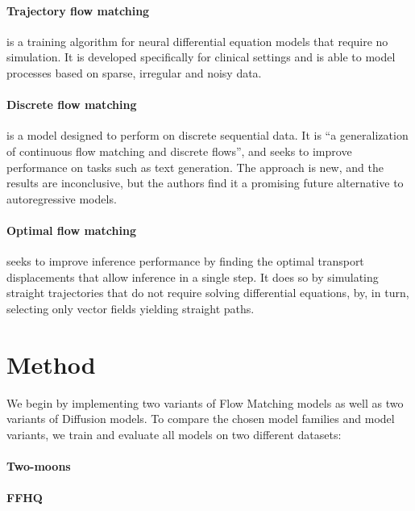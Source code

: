\documentclass{article}
\begin{document}
\paragraph{Trajectory flow matching} is a training algorithm for neural differential equation models that require no simulation. It is developed specifically for clinical settings and is able to model processes based on sparse, irregular and noisy data. \cite{zhang2024trajctory}

\paragraph{Discrete flow matching} is a model designed to perform on discrete sequential data. It is ``a generalization of continuous flow matching and discrete flows'', and seeks to improve performance on tasks such as text generation. The approach is new, and the results are inconclusive, but the authors find it a promising future alternative to autoregressive models. \cite{gat2024discrete} 

\paragraph{Optimal flow matching} seeks to improve inference performance by finding the optimal transport displacements that allow inference in a single step. It does so by simulating straight trajectories that do not require solving differential equations, by, in turn, selecting only vector fields yielding straight paths. \cite{kornilov2024optimal}

\section{Method}

We begin by implementing two variants of Flow Matching models as well as two variants of Diffusion models. To compare the chosen model families and model variants, we train and evaluate all models on two different datasets:

\paragraph{Two-moons}

\paragraph{FFHQ}


%

\printbibliography
\end{document}
